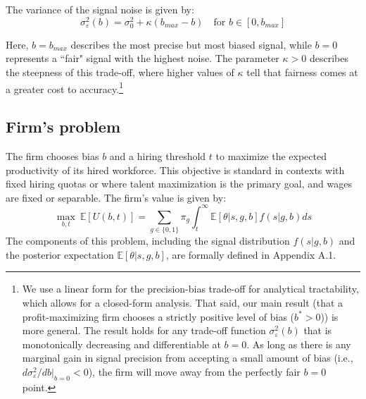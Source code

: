 \begin{definition}
The variance of the signal noise is given by:
\begin{equation}
\sigma_\varepsilon^2(b) = \sigma_0^2 + \kappa(b_{max} - b) \quad \text{for } b \in [0, b_{max}]
\end{equation}
\end{definition}

Here, $b=b_{max}$ describes the most precise but most biased signal, while $b=0$ represents a ``fair" signal with the highest noise. The parameter $\kappa > 0$ describes the steepness of this trade-off, where higher values of $\kappa$ tell that fairness comes at a greater cost to accuracy.\footnote{We use a linear form for the precision-bias trade-off for analytical tractability, which allows for a closed-form analysis. That said, our main result (that a profit-maximizing firm chooses a strictly positive level of bias ($b^*>0$)) is more general. The result holds for any trade-off function $\sigma_\varepsilon^2(b)$ that is monotonically decreasing and differentiable at $b=0$. As long as there is any marginal gain in signal precision from accepting a small amount of bias (i.e., $d\sigma_\varepsilon^2/db|_{b=0} < 0$), the firm will move away from the perfectly fair $b=0$ point.}

\subsection{Firm's problem}
The firm chooses bias $b$ and a hiring threshold $t$ to maximize the expected productivity of its hired workforce. This objective is standard in contexts with fixed hiring quotas or where talent maximization is the primary goal, and wages are fixed or separable. The firm's value is given by:
\begin{equation}
\max_{b, t} \ \mathbb{E}[U(b,t)] = \sum_{g \in \{0,1\}} \pi_g \int_t^\infty \mathbb{E}[\theta | s, g, b] f(s|g, b) ds
\end{equation}
The components of this problem, including the signal distribution $f(s|g,b)$ and the posterior expectation $\mathbb{E}[\theta|s,g,b]$, are formally defined in Appendix A.1.